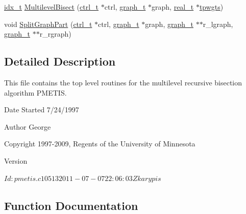 \begin{DoxyCompactItemize}
\item 
\hyperlink{a00876_aaa5262be3e700770163401acb0150f52}{idx\+\_\+t} \hyperlink{a00260_a33c48a23cc94ea0221fa5c7317cd0222}{Multilevel\+Bisect} (\hyperlink{a00742}{ctrl\+\_\+t} $\ast$ctrl, \hyperlink{a00734}{graph\+\_\+t} $\ast$graph, \hyperlink{a00876_a1924a4f6907cc3833213aba1f07fcbe9}{real\+\_\+t} $\ast$\hyperlink{a00879_aa91786cd8ea996ec49ed5b382eb7fc2f}{tpwgts})
\item 
void \hyperlink{a00260_a49d272affb67ce57b2d20dccd7f15f53}{Split\+Graph\+Part} (\hyperlink{a00742}{ctrl\+\_\+t} $\ast$ctrl, \hyperlink{a00734}{graph\+\_\+t} $\ast$graph, \hyperlink{a00734}{graph\+\_\+t} $\ast$$\ast$r\+\_\+lgraph, \hyperlink{a00734}{graph\+\_\+t} $\ast$$\ast$r\+\_\+rgraph)
\end{DoxyCompactItemize}


\subsection{Detailed Description}
This file contains the top level routines for the multilevel recursive bisection algorithm P\+M\+E\+T\+IS. 

\begin{DoxyDate}{Date}
Started 7/24/1997 
\end{DoxyDate}
\begin{DoxyAuthor}{Author}
George 

Copyright 1997-\/2009, Regents of the University of Minnesota 
\end{DoxyAuthor}
\begin{DoxyVersion}{Version}
\begin{DoxyVerb}$Id: pmetis.c 10513 2011-07-07 22:06:03Z karypis $ \end{DoxyVerb}
 
\end{DoxyVersion}


\subsection{Function Documentation}
\mbox{\label{a00260_a25fc90fd934931239b3c98ac4bdbce76}} 
